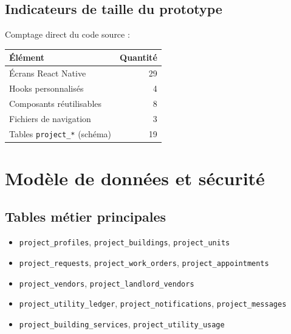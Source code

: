 \documentclass[11pt,a4paper]{article}
\begin{document}

\subsection{Indicateurs de taille du prototype}

Comptage direct du code source :

\begin{longtable}{lr}
\toprule
\textbf{Élément} & \textbf{Quantité}\\
\midrule
Écrans React Native & 29\\
Hooks personnalisés & 4\\
Composants réutilisables & 8\\
Fichiers de navigation & 3\\
Tables \texttt{project\_*} (schéma) & 19\\
\bottomrule
\end{longtable}

\section{Modèle de données et sécurité}

\subsection{Tables métier principales}

\begin{itemize}[leftmargin=1.4em]
  \item \texttt{project\_profiles}, \texttt{project\_buildings}, \texttt{project\_units}
  \item \texttt{project\_requests}, \texttt{project\_work\_orders}, \texttt{project\_appointments}
  \item \texttt{project\_vendors}, \texttt{project\_landlord\_vendors}
  \item \texttt{project\_utility\_ledger}, \texttt{project\_notifications}, \texttt{project\_messages}
  \item \texttt{project\_building\_services}, \texttt{project\_utility\_usage}
\end{itemize}
\end{document}
